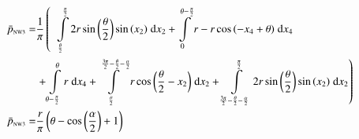 \begin{align}
    \bar{p}_{\text{\tiny{NW3}}} =&\frac{1}{\pi} \left(\;\;\int\limits_{\frac{\theta}{2}}^{\frac{\pi}{2}}2 r \sin{\left (\frac{\theta}{2} \right )} \sin{\left (x_{2} \right )}\;\mathrm{d}x_{2}+\int\limits_{0}^{\theta - \frac{\pi}{2}}r - r \cos{\left (- x_{4} + \theta \right )}\;\mathrm{d}x_{4}\right.\notag\\
 &\left.+\int\limits_{\theta - \frac{\pi}{2}}^{\theta}r\;\mathrm{d}x_{4}+\int\limits_{\frac{\theta}{2}}^{\frac{3 \pi}{2} - \frac{\theta}{2} - \frac{\alpha}{2}}r \cos{\left (\frac{\theta}{2} - x_{2} \right )}\;\mathrm{d}x_{2}+\int\limits_{\frac{3 \pi}{2} - \frac{\theta}{2} - \frac{\alpha}{2}}^{\frac{\pi}{2}}2 r \sin{\left (\frac{\theta}{2} \right )} \sin{\left (x_{2} \right )}\;\mathrm{d}x_{2}\right)\label{pNW3Def}\\
    \bar{p}_{\text{\tiny{NW3}}}  =& \frac{r}{\pi} \left(\theta - \cos{\left (\frac{\alpha}{2} \right )} + 1\right)\label{pNW3Sln}
\end{align}